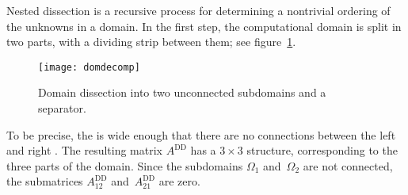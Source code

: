 Nested dissection is a recursive process for determining a nontrivial
ordering of the unknowns in a domain. In the first step, the
computational domain is split in two parts, with a dividing strip
between them; see figure~\ref{fig:domdecomp}.
\begin{figure}[ht]
  \texttt{[image: domdecomp]}
  \caption{Domain dissection into two unconnected subdomains and a separator.}
  \label{fig:domdecomp}
\end{figure}
\newcommand\Add{A^{\mathrm{DD}}}
To be precise, the  is wide enough that there are
no connections between the left and right . The resulting
matrix $\Add$ has a $3\times3$ structure, corresponding to the three
parts of the domain. Since the subdomains $\Omega_1$
and~$\Omega_2$ are not connected, the submatrices $\Add_{12}$
and~$\Add_{21}$ are zero.
